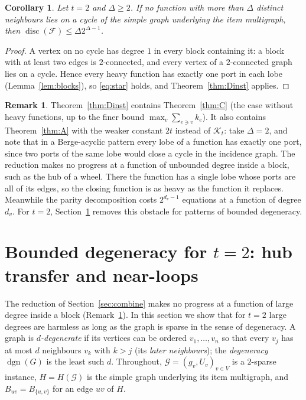 \documentclass[11pt,letterpaper]{article}
\newtheorem{corollary}[theorem]{Corollary}
\theoremstyle{definition}
\newtheorem{remark}[theorem]{Remark}
\newcommand{\cF}{\mathcal{F}}
\newcommand{\cG}{\mathcal{G}}
\DeclareMathOperator{\disc}{disc}
\begin{document}
\begin{corollary}\label{cor:heavyoffcycle}
Let $t=2$ and $\Delta\ge2$. If no function with more than $\Delta$ distinct neighbours lies on a
cycle of the simple graph underlying the item multigraph, then $\disc(\cF)\le\Delta2^{\Delta-1}$.
\end{corollary}

\begin{proof}
A vertex on no cycle has degree $1$ in every block containing it: a block with at least two edges
is $2$-connected, and every vertex of a $2$-connected graph lies on a cycle. Hence every heavy
function has exactly one port in each lobe (Lemma~\ref{lem:blocks}), so \eqref{eq:star} holds, and
Theorem~\ref{thm:Dinst} applies.
\end{proof}

\begin{remark}\label{rem:Dcontains}
Theorem~\ref{thm:Dinst} contains Theorem~\ref{thm:C} (the case without heavy functions, up to the
finer bound $\max_v\sum_{e\ni v}k_e$). It also contains Theorem~\ref{thm:A} with the weaker constant
$2t$ instead of $\mathcal{K}_t$: take $\Delta=2$, and note that in a Berge-acyclic pattern every lobe of a
function has exactly one port, since two ports of the same lobe would close a cycle in the incidence
graph. The reduction makes no progress at a function of unbounded degree inside a block, such as the
hub of a wheel. There the function has a single lobe whose ports are all of its edges, so the
closing function is as heavy as the function it replaces. Meanwhile the parity decomposition costs
$2^{d_v-1}$ equations at a function of degree $d_v$. For $t=2$, Section~\ref{sec:degeneracy}
removes this obstacle for patterns of bounded degeneracy.
\end{remark}

\section{Bounded degeneracy for \texorpdfstring{$t=2$}{t=2}: hub transfer and near-loops}\label{sec:degeneracy}

The reduction of Section~\ref{sec:combine} makes no progress at a function of large degree inside a
block (Remark~\ref{rem:Dcontains}). In this section we show that for $t=2$ large degrees are
harmless as long as the graph is sparse in the sense of degeneracy. A graph is
\emph{$d$-degenerate} if its vertices can be ordered $v_1,\dots,v_n$ so that every $v_j$ has at
most $d$ neighbours $v_k$ with $k>j$ (its \emph{later neighbours}); the \emph{degeneracy}
$\operatorname{dgn}(G)$ is the least such $d$. Throughout, $\cG=(g_v,U_v)_{v\in V}$ is a $2$-sparse
instance, $H=H(\cG)$ is the simple graph underlying its item multigraph, and $B_{uv}=B_{\{u,v\}}$
for an edge $uv$ of $H$.
\end{document}
